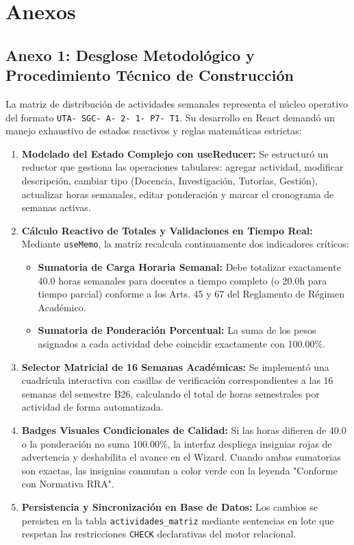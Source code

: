 \documentclass[12pt,a4paper]{article}
\begin{document}
\vspace{0.4cm}

\section{Anexos}

\subsection*{Anexo 1: Desglose Metodológico y Procedimiento Técnico de Construcción}
La matriz de distribución de actividades semanales representa el núcleo operativo del formato \texttt{UTA- SGC- A- 2- 1- P7- T1}. Su desarrollo en React demandó un manejo exhaustivo de estados reactivos y reglas matemáticas estrictas:

\begin{enumerate}[leftmargin=1.5em, itemsep=3pt]
    \item \textbf{Modelado del Estado Complejo con useReducer:} Se estructuró un reductor que gestiona las operaciones tabulares: agregar actividad, modificar descripción, cambiar tipo (Docencia, Investigación, Tutorías, Gestión), actualizar horas semanales, editar ponderación y marcar el cronograma de semanas activas.
    \item \textbf{Cálculo Reactivo de Totales y Validaciones en Tiempo Real:} Mediante \texttt{useMemo}, la matriz recalcula continuamente dos indicadores críticos:
    \begin{itemize}[leftmargin=1.2em, itemsep=2pt]
        \item \textbf{Sumatoria de Carga Horaria Semanal:} Debe totalizar exactamente 40.0 horas semanales para docentes a tiempo completo (o 20.0h para tiempo parcial) conforme a los Arts. 45 y 67 del Reglamento de Régimen Académico.
        \item \textbf{Sumatoria de Ponderación Porcentual:} La suma de los pesos asignados a cada actividad debe coincidir exactamente con 100.00\%.
    \end{itemize}
    \item \textbf{Selector Matricial de 16 Semanas Académicas:} Se implementó una cuadrícula interactiva con casillas de verificación correspondientes a las 16 semanas del semestre B26, calculando el total de horas semestrales por actividad de forma automatizada.
    \item \textbf{Badges Visuales Condicionales de Calidad:} Si las horas difieren de 40.0 o la ponderación no suma 100.00\%, la interfaz despliega insignias rojas de advertencia y deshabilita el avance en el Wizard. Cuando ambas sumatorias son exactas, las insignias conmutan a color verde con la leyenda "Conforme con Normativa RRA".
    \item \textbf{Persistencia y Sincronización en Base de Datos:} Los cambios se persisten en la tabla \texttt{actividades\_\allowbreak  matriz} mediante sentencias en lote que respetan las restricciones \texttt{CHECK} declarativas del motor relacional.
\end{enumerate}
\end{document}
